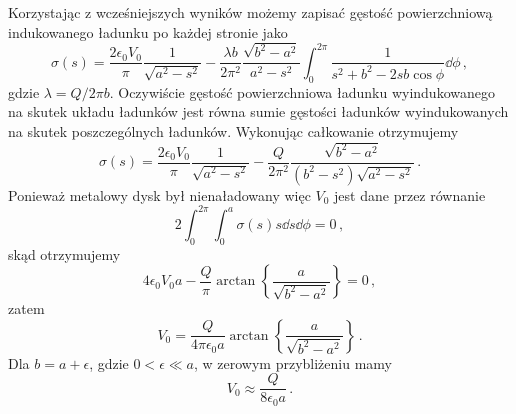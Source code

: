 \documentclass[../main.tex]{subfiles}
\begin{document}
\begin{enumerate}
    Korzystając z wcześniejszych wyników możemy zapisać gęstość powierzchniową indukowanego ładunku po każdej stronie jako
    \begin{equation*}
        \sigma(s)=\frac{2\epsilon_0V_0}{\pi}\frac{1}{\sqrt{a^2-s^2}}-\frac{\lambda b}{2\pi^2}\frac{\sqrt{b^2-a^2}}{a^2-s^2}\int_0^{2\pi}\frac{1}{s^2+b^2-2sb\cos\phi}\dd{\phi}\,,
    \end{equation*}
    gdzie \(\lambda=Q/2\pi b\). Oczywiście gęstość powierzchniowa ładunku wyindukowanego na skutek układu ładunków jest równa sumie gęstości ładunków wyindukowanych na skutek poszczególnych ładunków. Wykonując całkowanie otrzymujemy
    \begin{equation*}
        \sigma(s)=\frac{2\epsilon_0V_0}{\pi}\frac{1}{\sqrt{a^2-s^2}}-\frac{Q}{2\pi^2}\frac{\sqrt{b^2-a^2}}{(b^2-s^2)\sqrt{a^2-s^2}}\,.
    \end{equation*}
    Ponieważ metalowy dysk był nienaładowany więc \(V_0\) jest dane przez równanie
    \begin{equation*}
        2\int_0^{2\pi}\int_0^a\sigma(s)s\dd{s}\dd{\phi}=0\,,
    \end{equation*}
    skąd otrzymujemy
    \begin{equation*}
        4\epsilon_0V_0a-\frac{Q}{\pi}\arctan\left\{\frac{a}{\sqrt{b^2-a^2}}\right\}=0\,,
    \end{equation*}
    zatem
    \begin{equation*}
        V_0=\frac{Q}{4\pi\epsilon_0a}\arctan\left\{\frac{a}{\sqrt{b^2-a^2}}\right\}\,.
    \end{equation*}
    Dla \(b=a+\epsilon\), gdzie \(0<\epsilon\ll a\), w zerowym przybliżeniu mamy
    \begin{equation*}
        V_0\approx \frac{Q}{8\epsilon_0a}\,.
    \end{equation*}
\end{enumerate}
\end{document}
